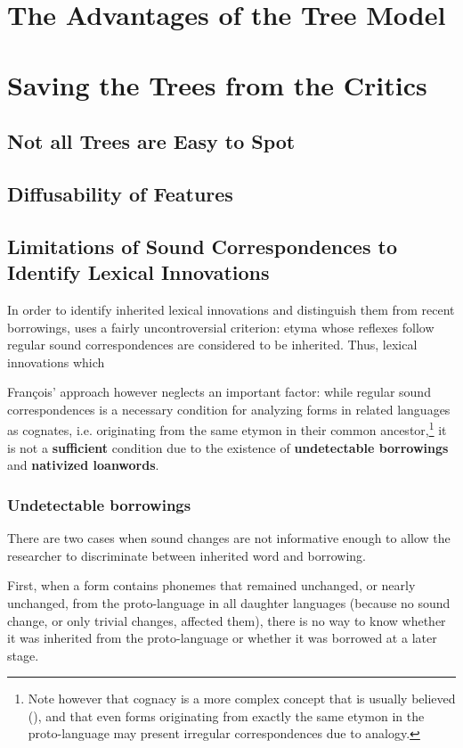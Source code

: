 \documentclass[oneside,a4paper,11pt]{article}
\begin{document}
 
\section{The Advantages of the Tree Model}
\section{Saving the Trees from the Critics}
\subsection{Not all Trees are Easy to Spot}
\subsection{Diffusability of Features}


\subsection{Limitations of Sound Correspondences to Identify Lexical Innovations}
In order to identify inherited lexical innovations and distinguish them from recent borrowings, \citet[176-8]{francois15tree} uses a fairly uncontroversial criterion: etyma whose reflexes follow regular sound correspondences are considered to be inherited. Thus, lexical innovations which 

François' approach however neglects an important factor: while regular sound correspondences is a necessary condition for analyzing forms in related languages as cognates, i.e. originating from the same etymon in their common ancestor,\footnote{Note however that cognacy is a more complex concept that is usually believed (\citealt{list16cognacy}), and that even forms originating from exactly the same etymon in the proto-language may present irregular correspondences due to analogy. } it is not a \textbf{sufficient} condition due to the existence of \textbf{undetectable borrowings} and \textbf{nativized loanwords}.  


\subsubsection{Undetectable borrowings}
There are two cases when sound changes are not informative enough to allow the researcher to discriminate between inherited word and borrowing.

First, when a form contains phonemes that remained unchanged, or nearly unchanged, from the proto-language in all daughter languages (because no sound change, or only trivial changes, affected them), there is no way to know whether it was inherited from the proto-language or whether it was borrowed at a later stage. 
\end{document}
